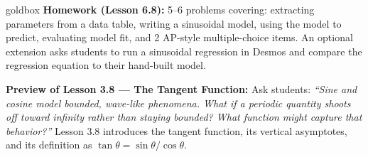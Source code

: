 \documentclass[10pt]{article}
\begin{document}
\vspace{0.08in}

\begin{skillbox}{goldbox}
\textbf{Homework (Lesson 6.8):} 5--6 problems covering: extracting parameters
from a data table, writing a sinusoidal model, using the model to predict,
evaluating model fit, and 2 AP-style multiple-choice items. An optional extension
asks students to run a sinusoidal regression in Desmos and compare the regression
equation to their hand-built model.

\textbf{Preview of Lesson 3.8 --- The Tangent Function:}
Ask students: \textit{``Sine and cosine model bounded, wave-like phenomena.
What if a periodic quantity shoots off toward infinity rather than staying bounded?
What function might capture that behavior?''} Lesson 3.8 introduces the tangent
function, its vertical asymptotes, and its definition as $\tan\theta = \sin\theta / \cos\theta$.
\end{skillbox}
\end{document}
